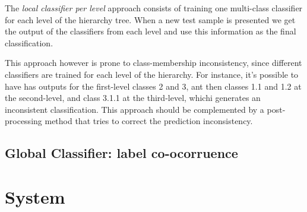 \documentclass[11pt]{article}
\begin{document}


The \textit{local classifier per level} approach consists of training one multi-class classifier
for each level of the hierarchy tree. When a new test sample is presented we get the output of the
classifiers from each level and use this information as the final classification.

This approach however is prone to class-membership inconsistency, since different classifiers are
trained for each level of the hierarchy. For instance, it's possible to have has outputs for the
first-level classes 2 and 3, ant then classes 1.1 and 1.2 at the second-level, and class 3.1.1
at the third-level, whichi generates an inconsistent classification. This approach should
be complemented by a post-processing method that tries to correct the prediction inconsistency.



\begin{comment}
In essence, in this top-down approach, for each new example in the test set, the system first
predicts its first-level (most generic) class, then it uses that predicted class to narrow
the choices of classes to be predicted at the second level (the only valid candidate
second-level classes are the children of the class predicted at the first level), and so on,
recursively, until the most specific prediction is made.

This local approach has some disadvantages, a disadvantage of the top-down class-prediction
approach (which is shared by all the three types of local classifiers discussed next) is that an
error at a certain class level is going to be propagated downwards the hierarchy, unless some
procedure for avoiding this problem is used
\end{comment}



\subsection{Global Classifier: label co-ocorruence}



\section{System}
\end{document}
